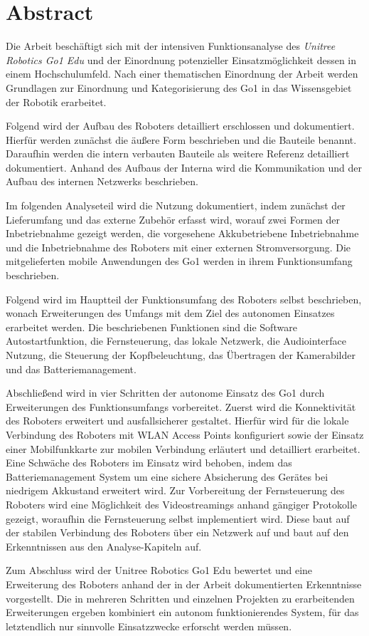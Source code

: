 \clearpage
{}
\pagestyle{empty}
\section*{Abstract}

Die Arbeit \emph{\mytitle{}} beschäftigt sich mit der intensiven Funktionsanalyse des \emph{Unitree Robotics Go1 Edu} und der
Einordnung potenzieller Einsatzmöglichkeit dessen in einem Hochschulumfeld.
Nach einer thematischen Einordnung der Arbeit werden Grundlagen zur Einordnung und Kategorisierung des Go1 in das Wissensgebiet
der Robotik erarbeitet.

Folgend wird der Aufbau des Roboters detailliert erschlossen und dokumentiert.
Hierfür werden zunächst die äußere Form beschrieben und die Bauteile benannt.
Daraufhin werden die intern verbauten Bauteile als weitere Referenz detailliert dokumentiert.
Anhand des Aufbaus der Interna wird die Kommunikation und der Aufbau des internen Netzwerks beschrieben.

Im folgenden Analyseteil wird die Nutzung dokumentiert, indem zunächst der Lieferumfang und das externe Zubehör erfasst wird, worauf zwei
Formen der Inbetriebnahme gezeigt werden, die vorgesehene Akkubetriebene Inbetriebnahme und die Inbetriebnahme
des Roboters mit einer externen Stromversorgung.
Die mitgelieferten mobile Anwendungen des Go1 werden in ihrem Funktionsumfang beschrieben.

Folgend wird im Hauptteil der Funktionsumfang des Roboters selbst beschrieben, wonach Erweiterungen des Umfangs mit
dem Ziel des autonomen Einsatzes erarbeitet werden.
Die beschriebenen Funktionen sind die Software Autostartfunktion, die Fernsteuerung, das lokale Netzwerk,
die Audiointerface Nutzung, die Steuerung der Kopfbeleuchtung, das Übertragen der Kamerabilder und das Batteriemanagement.

Abschließend wird in vier Schritten der autonome Einsatz des Go1 durch Erweiterungen des Funktionsumfangs vorbereitet.
Zuerst wird die Konnektivität des Roboters erweitert und ausfallsicherer gestaltet.
Hierfür wird für die lokale Verbindung des Roboters mit WLAN Access Points konfiguriert sowie der Einsatz einer
Mobilfunkkarte zur mobilen Verbindung erläutert und detailliert erarbeitet.
Eine Schwäche des Roboters im Einsatz wird behoben, indem das Batteriemanagement System um eine sichere Absicherung
des Gerätes bei niedrigem Akkustand erweitert wird.
Zur Vorbereitung der Fernsteuerung des Roboters wird eine Möglichkeit des Videostreamings anhand gängiger Protokolle
gezeigt, woraufhin die Fernsteuerung selbst implementiert wird.
Diese baut auf der stabilen Verbindung des Roboters über ein Netzwerk auf und baut auf den Erkenntnissen aus den Analyse-Kapiteln auf.

Zum Abschluss wird der Unitree Robotics Go1 Edu bewertet und eine Erweiterung des Roboters anhand der in der Arbeit
dokumentierten Erkenntnisse vorgestellt.
Die in mehreren Schritten und einzelnen Projekten zu erarbeitenden Erweiterungen ergeben kombiniert ein autonom
funktionierendes System, für das letztendlich nur sinnvolle Einsatzzwecke erforscht werden müssen.

\restoregeometry


